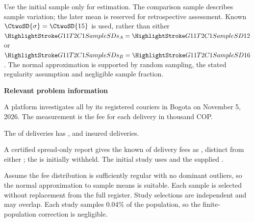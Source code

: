 Use the initial sample only for estimation. The comparison sample describes sample variation; the later mean is reserved for retrospective assessment. Known $\CtwoSD{\sigma}=\CtwoSD{15}$ is used, rather than either $\SSD{s_A}=\SSD{12}$ or $\SSD{s_B}=\SSD{16}$. The normal approximation is supported by random sampling, the stated regularity assumption and negligible sample fraction.

\secInicio[][sec:p3]

\clearpage



\textbf{Relevant problem information}

\begin{probleminfoexcerpt}
A platform investigates all    by its registered couriers in Bogota on November 5, 2026. The measurement is the fee for each delivery in thousand COP.
\end{probleminfoexcerpt}

\begin{probleminfoexcerpt}
The     of  deliveries has     ,       and  insured deliveries.
\end{probleminfoexcerpt}

\begin{probleminfoexcerpt}
A certified spread-only report gives the known    of delivery fees as   , distinct from either   ; the   is initially withheld. The initial study uses   and the supplied      .
\end{probleminfoexcerpt}

\begin{probleminfoexcerpt}
Assume the fee distribution is sufficiently regular with no dominant outliers, so the normal approximation to sample means is suitable. Each sample is selected without replacement from the full register. Study selections are independent and may overlap. Each study samples 0.04\% of the population, so the finite-population correction is negligible.
\end{probleminfoexcerpt}

